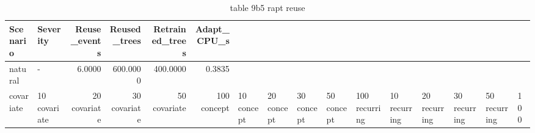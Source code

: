 \begin{table}
\caption{table 9b5 rapt reuse}
\label{tab:table_9b5_rapt_reuse}
\begin{tabular}{llrrrr}
\toprule
Scenario & Severity & Reuse_events & Reused_trees & Retrained_trees & Adapt_CPU_s \\
\midrule
natural & - & 6.0000 & 600.0000 & 400.0000 & 0.3835 \\
covariate & 10%
covariate & 20%
covariate & 30%
covariate & 50%
covariate & 100%
concept & 10%
concept & 20%
concept & 30%
concept & 50%
concept & 100%
recurring & 10%
recurring & 20%
recurring & 30%
recurring & 50%
recurring & 100%
\bottomrule
\end{tabular}
\end{table}
